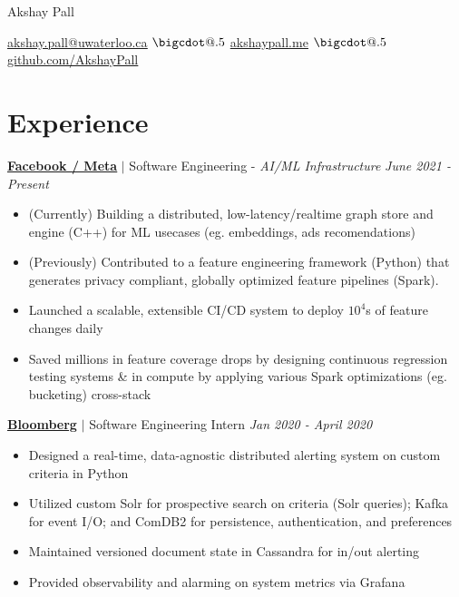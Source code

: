 \documentclass[paper=a4,fontsize=15pt]{scrartcl}
\makeatletter
\newcommand*\bigcdot{\mathpalette\bigcdot@{.5}}
\newcommand*\bigcdot@[2]{\mathbin{\vcenter{\hbox{\scalebox{#2}{$\m@th#1\bullet$}}}}}
\newcommand{\smolboispace}{\vspace*{0.1em}}
\newcommand{\bighalfspace}{\vspace*{0.75em}}
\newcommand{\http}[1]{\href{http://#1}{\ul{#1}}}
\newcommand{\https}[1]{\href{https://#1}{\ul{#1}}}
\newcommand{\email}[1]{\href{mailto:#1}{\ul{#1}}}
\makeatother
\begin{document}
\begin{center}
  {\fontsize{35}{40}\selectfont Akshay Pall \par}

  \smolboispace
  \smolboispace

  {\normalsize
    \email{akshay.pall@uwaterloo.ca}
    $\bigcdot$ \http{akshaypall.me}
    $\bigcdot$ \https{github.com/AkshayPall}
    \par}
\end{center}

 \section*{Experience}{}
\normalsize
\noindent \href{https://facebook.com}{\textbf{\ul{Facebook / Meta}}}
$\vert$ \small Software Engineering - \textit{AI/ML Infrastructure}
{\hfill \footnotesize \textit{June 2021 - Present}}
\begin{itemize}[noitemsep,leftmargin=20pt,label=\raisebox{0.25ex}{\tiny$\bullet$},topsep=5pt]
    \small
    \item (Currently) Building a distributed, low-latency/realtime graph store and engine (C++) for ML usecases (eg. embeddings, ads recomendations)
    
    \item (Previously) Contributed to a feature engineering framework (Python) that generates privacy compliant, globally optimized feature pipelines (Spark). 
    \item Launched a scalable, extensible  CI/CD system to deploy $10^{4}$s of feature changes daily
    \item Saved millions in feature coverage drops by designing continuous regression testing systems \& in compute by applying various Spark optimizations (eg. bucketing) cross-stack
    
\end{itemize}

\bighalfspace
\normalsize
\noindent \href{https://bloomberg.com}{\textbf{\ul{Bloomberg}}}
$\vert$ \small Software Engineering Intern
{\hfill \footnotesize \textit{Jan 2020 - April 2020}}
\begin{itemize}[noitemsep,leftmargin=20pt,label=\raisebox{0.25ex}{\tiny$\bullet$},topsep=5pt]
  \small
 
  \item Designed a real-time, data-agnostic distributed alerting system on custom criteria in Python
    
  \item Utilized custom Solr for prospective search on criteria (Solr queries); Kafka for event I/O; and ComDB2 for persistence, authentication, and preferences

  \item Maintained versioned document state in Cassandra for in/out alerting
  
  \item Provided observability and alarming on system metrics via Grafana
  
\end{itemize}
\end{document}

